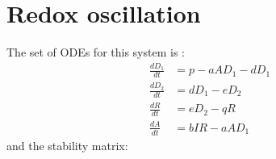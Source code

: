 \documentclass[letterpaper,10pt,english,openany,oneside]{sphinxmanual}
\begin{document}
\section{Redox oscillation}
\label{\detokenize{tutorial/redox_oscillation:redox-oscillation}}\label{\detokenize{tutorial/redox_oscillation::doc}}
The set of ODEs for this system is :
\begin{equation*}
\begin{split}\frac{dD_{1}}{dt} &= p - aA D_{1} -d D_{1}\\
\frac{dD_{2}}{dt} &= dD_{1} - eD_{2}\\
\frac{dR}{dt} &= eD_{2} - qR\\
\frac{dA}{dt} &= bIR - aAD_{1}\end{split}
\end{equation*}
and the stability matrix:
\end{document}
